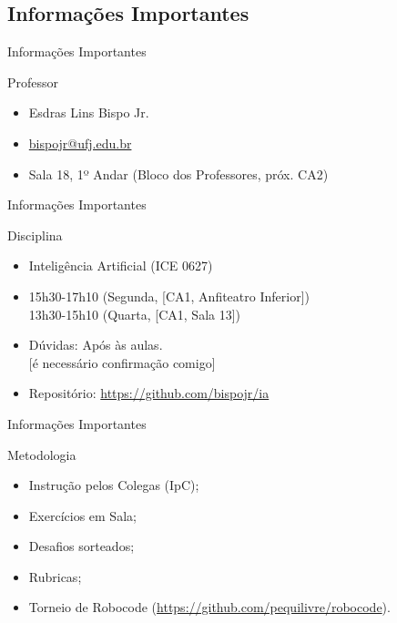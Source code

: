 \documentclass[xcolor=dvipsnames,table]{beamer}
\begin{document}
	\subsection{Informações Importantes}
	\begin{frame}{Informações Importantes}
		\begin{block}{Professor}
			\begin{itemize}
				\item Esdras Lins Bispo Jr.
				\item \url{bispojr@ufj.edu.br}
				\item Sala 18, 1º Andar (Bloco dos Professores, próx. CA2)
			\end{itemize}
		\end{block}
	\end{frame}	
	
	\begin{frame}{Informações Importantes}
		\begin{block}{Disciplina}
			\begin{itemize}
				\item Inteligência Artificial (ICE 0627)
				\item 15h30-17h10 (Segunda, [CA1, Anfiteatro Inferior])\\
				 13h30-15h10 (Quarta, [CA1, Sala 13])
				\item Dúvidas: Após às aulas.\\
				{\color{red}[é necessário confirmação comigo]}
				\item Repositório: \url{https://github.com/bispojr/ia}
			\end{itemize}
		\end{block}
	\end{frame}	
	
	\begin{frame}{Informações Importantes}
		\begin{block}{Metodologia}
			\begin{itemize}
				\item Instrução pelos Colegas (IpC);
				\item Exercícios em Sala;
				\item Desafios sorteados;
                \item Rubricas;
				\item Torneio de Robocode (\url{https://github.com/pequilivre/robocode}).
			\end{itemize}
		\end{block}
	\end{frame}
\end{document}
